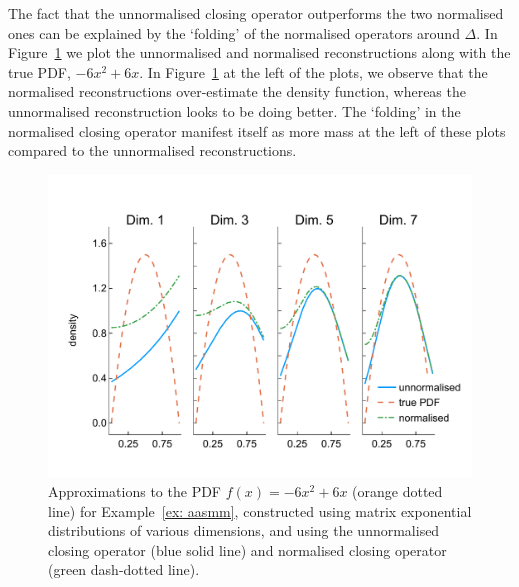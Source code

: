 \begin{example}
The fact that the unnormalised closing operator outperforms the two normalised ones can be explained by the `folding' of the normalised operators around \(\Delta\). In Figure~\ref{fig: pdf reconstructed quadratic} we plot the unnormalised and normalised reconstructions along with the true PDF, \(-6x^2+6x\). In Figure~\ref{fig: pdf reconstructed quadratic} at the left of the plots, we observe that the normalised reconstructions over-estimate the density function, whereas the unnormalised reconstruction looks to be doing better. The `folding' in the normalised closing operator manifest itself as more mass at the left of these plots compared to the unnormalised reconstructions. 
\begin{figure}[h]
	\centering
	\includegraphics[width=\textwidth,trim={0cm 1.25cm 0cm 1.25cm},clip]{chapter6/figs/qbdrap_closing_vec/fun6/pdfs_formatted.pdf}
	\caption{Approximations to the PDF \(f(x)=-6x^2+6x\) (orange dotted line) for Example~\ref{ex: aasmm}, constructed using matrix exponential distributions of various dimensions, and using the unnormalised closing operator (blue solid line) and normalised closing operator (green dash-dotted line).} 
	\label{fig: pdf reconstructed quadratic}
\end{figure} 
\exampleFloatBarrier
\end{example}


